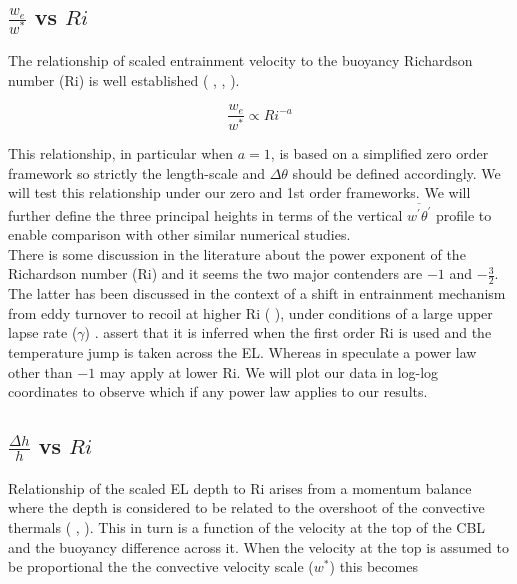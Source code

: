 \clearpage

\subsection{$\frac{w_{e}}{w^{*}}$ vs $Ri$}

The relationship of scaled entrainment velocity to the buoyancy Richardson number (\acs{Ri}) is well established (\citeauthor{Deardorff79} \cite{Deardorff79} \citeauthor{DearWill80}, \cite{DearWill80}, \citeauthor{Stull-BLMetIntro} \cite{Stull-BLMetIntro}).  

\begin{equation}
\frac{w_{e}}{w^{*}} \propto Ri^{-a}
\end{equation}

This relationship, in particular when $a=1$, is based on a simplified zero order framework so strictly the length-scale and $\Delta \theta$ should be defined accordingly.  We will test this relationship under our zero and 1st order frameworks.   We will further define the three principal heights in terms of the vertical $\overline{w^{'}\theta^{'}}$ profile to enable comparison with other similar numerical studies.\\

There is some discussion in the literature about the power exponent of the Richardson number (\acs{Ri}) and it seems the two major contenders are $-1$ and $-\frac{3}{2}$.  The latter has been discussed in the context of a shift in entrainment mechanism from eddy turnover to recoil at higher \acs{Ri} (\citeauthor{Turner86} \cite{Turner86}), under conditions of a large upper lapse rate ($\gamma$) \citeauthor{DearWill80} \cite{DearWill80}. \citeauthor{FedConzMir04} \cite{FedConzMir04} assert that it is inferred when the first order \acs{Ri} is used and the temperature jump is taken across the \acs{EL}. Whereas \citeauthor{SullMoengStev} in \cite{SullMoengStev} speculate a power law other than $-1$ may apply at lower \acs{Ri}.  We will plot our data in log-log coordinates to observe which if any power law applies to our results.

\subsection{$\frac{\Delta h}{h}$ vs $Ri$}

Relationship of the scaled \acs{EL} depth to \acs{Ri} arises from a momentum balance where the depth is considered to be related to the overshoot of the convective thermals (\citeauthor{Stull73} \cite{Stull73}, \citeauthor{DearWill80} \cite{DearWill80}).  This in turn is a function of the velocity at the top of the \acs{CBL} and the buoyancy difference across it.  When the velocity at the top is assumed to be proportional the the convective velocity scale ($w^{*}$) this becomes

